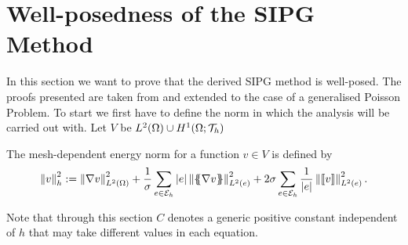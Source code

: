 

\section{Well-posedness of the SIPG Method}

In this section we want to prove that the derived SIPG method is well-posed. The proofs presented are taken from \cite{BS2002, PPO+2000} and extended to the case of a generalised Poisson Problem. 
To start we first have to define the norm in which the analysis will be carried out with. Let $V$ be $L^2(\Omega) \cup H^1(\Omega; \mathcal{T}_h)$ 
\begin{definition} \label{def: energy norm}
	The mesh-dependent energy norm for a function $v \in V$ is defined by
	\[
	\left\lVert v \right\rVert_{h} ^2 := \left\lVert \nabla v \right\rVert_{L^2(\Omega)}^2 + \frac 1 \sigma \sum_{e \in \mathcal{E}_h} |e|\left\lVert \{\!\!\{ \nabla v \}\!\!\} \right\rVert_{L^2(e)}^2 + 2 \sigma \sum_{e \in \mathcal{E}_h} \frac 1 {|e|}\left\lVert \llbracket v \rrbracket \right\rVert_{L^2(e)}^2.
	\]
\end{definition}

Note that through this section $C$ denotes a generic positive constant independent of $h$ that may take different values in each equation.

